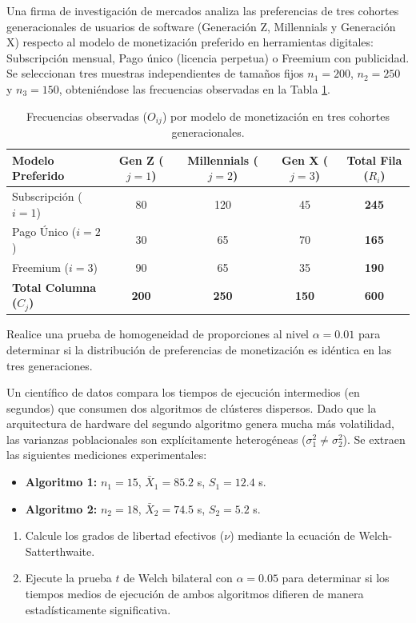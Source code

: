 \begin{problema}
	\label{prob:homogeneidad_contingencia}
	Una firma de investigación de mercados analiza las preferencias de tres cohortes generacionales de usuarios de software (Generación Z, Millennials y Generación X) respecto al modelo de monetización preferido en herramientas digitales: Subscripción mensual, Pago único (licencia perpetua) o Freemium con publicidad. Se seleccionan tres muestras independientes de tamaños fijos $n_1 = 200$, $n_2 = 250$ y $n_3 = 150$, obteniéndose las frecuencias observadas en la Tabla \ref{tab:homog_obs}.
	\begin{table}[h!]
		\centering
		\begin{tabular}{lcccc}
			\hline
			\textbf{Modelo Preferido} & \textbf{Gen Z ($j=1$)} & \textbf{Millennials ($j=2$)} & \textbf{Gen X ($j=3$)} & \textbf{Total Fila ($R_i$)} \\ \hline
			Subscripción ($i=1$) & 80 & 120 & 45 & \textbf{245} \\
			Pago Único ($i=2$) & 30 & 65 & 70 & \textbf{165} \\
			Freemium ($i=3$) & 90 & 65 & 35 & \textbf{190} \\ \hline
			\textbf{Total Columna ($C_j$)} & \textbf{200} & \textbf{250} & \textbf{150} & \textbf{600} \\ \hline
		\end{tabular}
		\caption{Frecuencias observadas ($O_{ij}$) por modelo de monetización en tres cohortes generacionales.}
		\label{tab:homog_obs}
	\end{table}
	
	Realice una prueba de homogeneidad de proporciones al nivel $\alpha = 0.01$ para determinar si la distribución de preferencias de monetización es idéntica en las tres generaciones.
\end{problema}

\begin{problema}
	\label{prob:doc_welch_hetero}
	Un científico de datos compara los tiempos de ejecución intermedios (en segundos) que consumen dos algoritmos de clústeres dispersos. Dado que la arquitectura de hardware del segundo algoritmo genera mucha más volatilidad, las varianzas poblacionales son explícitamente heterogéneas ($\sigma_1^2 \neq \sigma_2^2$). Se extraen las siguientes mediciones experimentales:
	\begin{itemize}
		\item \textbf{Algoritmo 1:} $n_1 = 15$, $\bar{X}_1 = 85.2$ s, $S_1 = 12.4$ s.
		\item \textbf{Algoritmo 2:} $n_2 = 18$, $\bar{X}_2 = 74.5$ s, $S_2 = 5.2$ s.
	\end{itemize}
	\begin{enumerate}
		\item Calcule los grados de libertad efectivos ($\nu$) mediante la ecuación de Welch-Satterthwaite.
		\item Ejecute la prueba $t$ de Welch bilateral con $\alpha = 0.05$ para determinar si los tiempos medios de ejecución de ambos algoritmos difieren de manera estadísticamente significativa.
	\end{enumerate}
\end{problema}

